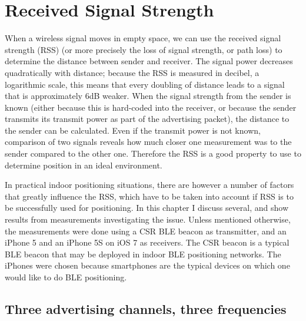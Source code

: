 \chapter{Received Signal Strength}



When a wireless signal moves in empty space, we can use the received signal strength (RSS) (or more precisely the loss of signal strength, or path loss) to determine the distance between sender and receiver.
The signal power decreases quadratically with distance; because the RSS is measured in decibel, a logarithmic scale, this means that every doubling of distance leads to a signal that is approximately 6dB weaker.
When the signal strength from the sender is known (either because this is hard-coded into the receiver, or because the sender transmits its transmit power as part of the advertising packet), the distance to the sender can be calculated.
Even if the transmit power is not known, comparison of two signals reveals how much closer one measurement was to the sender compared to the other one.
Therefore the RSS is a good property to use to determine position in an ideal environment.

In practical indoor positioning situations, there are however a number of factors that greatly influence the RSS, which have to be taken into account if RSS is to be successfully used for positioning.
In this chapter I discuss several, and show results from measurements investigating the issue.
Unless mentioned otherwise, the measurements were done using a CSR BLE beacon as transmitter, and an iPhone 5 and an iPhone 5S on iOS 7 as receivers.
The CSR beacon is a typical BLE beacon that may be deployed in indoor BLE positioning networks.
The iPhones were chosen because smartphones are the typical devices on which one would like to do BLE positioning.

\section{Three advertising channels, three frequencies}




